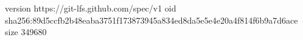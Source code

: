 version https://git-lfs.github.com/spec/v1
oid sha256:89d5ccfb2b48eaba3751f173873945a834ed8da5e5e4e20a4f814f6b9a7d6ace
size 349680
